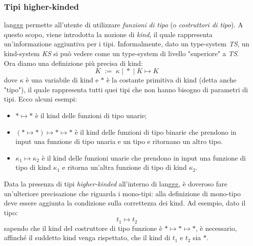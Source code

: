 \documentclass[10pt,a4paper]{article}
\begin{document}
\subsubsection{Tipi higher-kinded}
langgg permette all'utente di utilizzare \textit{funzioni di tipo} (o \textit{costruttori di tipo}). A questo scopo,
viene introdotta la nozione di \textit{kind}, il quale rappresenta un'informazione aggiuntiva per i tipi. Informalmente,
dato un type-system \textit{TS}, un kind-system \textit{KS} si può vedere come un type-system di livello "superiore"
a \textit{TS}. Ora diamo una definizione più precisa di kind:
\[ K \; := \; \kappa \; | \; * \; | \; K \mapsto K \]
dove $ \kappa $ è una variabile di kind e $ * $ è la costante primitiva di kind (detta anche "tipo"), il quale
rappresenta tutti quei tipi che non hanno bisogno di parametri di tipi. Ecco alcuni esempi:
\begin{itemize}
    \item $ * \mapsto * $ è il kind delle funzioni di tipo unarie;
    \item $ (* \mapsto *) \mapsto * \mapsto * $ è il kind delle funzioni di tipo binarie che prendono in input una
    funzione di tipo unaria e un tipo e ritornano un altro tipo.
    \item $ \kappa_1 \mapsto \kappa_2 $ è il kind delle funzioni unarie che prendono in input una funzione di tipo
    di kind $ \kappa_1 $ e ritorna un'altra funzione di tipo di kind $ \kappa_2 $.
\end{itemize}
Data la presenza di tipi \textit{higher-kinded} all'interno di langgg, è doveroso fare un'ulteriore precisazione che
riguarda i mono-tipi: alla definizione di mono-tipo deve essere aggiunta la condizione sulla correttezza dei kind.
Ad esempio, dato il tipo:
\[ t_1 \mapsto t_2 \]
sapendo che il kind del costruttore di tipo funzione è $ * \mapsto * \mapsto * $, è necessario, affinché il suddetto
kind venga rispettato, che il kind di $ t_1 $ e $ t_2 $ sia $ * $.
\end{document}
